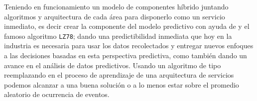 Teniendo en funcionamiento un modelo de componentes híbrido juntando algoritmos y arquitectura de cada área para disponerlo como un servicio inmediato, es decir crear la componente \online del modelo predictivo con ayuda de \losslessdatacompression y el famoso algoritmo \texttt{LZ78}; dando una predictibilidad inmediata que hoy en la industria es necesaria para usar los datos recolectados y entregar nuevos enfoques a las decisiones basadas en esta perspectiva predictiva, como también dando un avance en el análisis de datos predictivos. 
Usando un algoritmo de tipo \LDC reemplazando en el proceso de aprendizaje de una arquitectura de  servicios  \machinelearning podemos alcanzar a una buena solución o a lo menos estar sobre el promedio aleatorio de ocurrencia de eventos.

